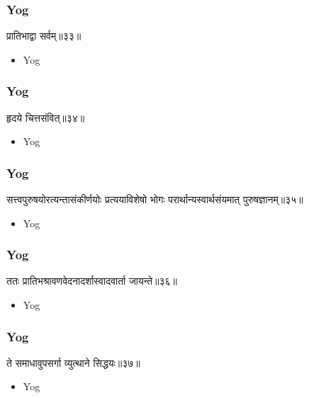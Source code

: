 \begin{frame}[fragile]\frametitle{Yog}
\begin{sanskrit}
प्रातिभाद्वा सर्वम्॥३३॥
\end{sanskrit}
	\begin{itemize}
	\item Yog 
	\end{itemize}
\end{frame}

\begin{frame}[fragile]\frametitle{Yog}
\begin{sanskrit}
हृदये चित्तसंवित्॥३४॥
\end{sanskrit}
	\begin{itemize}
	\item Yog 
	\end{itemize}
\end{frame}


\begin{frame}[fragile]\frametitle{Yog}
\begin{sanskrit}
सत्त्वपुरुषयोरत्यन्तासंकीर्णयोः प्रत्ययाविशेषो भोगः परार्थान्यस्वार्थसंयमात् पुरुषज्ञानम्॥३५॥
\end{sanskrit}
	\begin{itemize}
	\item Yog 
	\end{itemize}
\end{frame}


\begin{frame}[fragile]\frametitle{Yog}
\begin{sanskrit}
ततः प्रातिभश्रावणवेदनादर्शास्वादवार्ता जायन्ते॥३६॥
\end{sanskrit}
	\begin{itemize}
	\item Yog 
	\end{itemize}
\end{frame}

\begin{frame}[fragile]\frametitle{Yog}
\begin{sanskrit}
ते समाधावुपसर्गा व्युत्थाने सिद्धयः॥३७॥
\end{sanskrit}
	\begin{itemize}
	\item Yog 
	\end{itemize}
\end{frame}


